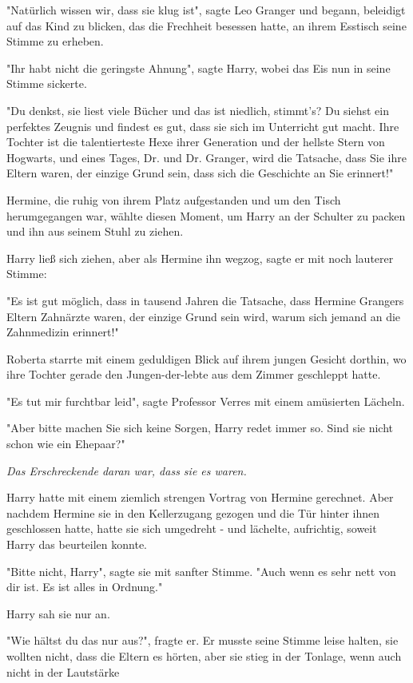 {"Natürlich wissen wir, dass sie klug ist", sagte Leo Granger und begann, beleidigt auf das Kind zu blicken, das die Frechheit besessen hatte, an ihrem Esstisch seine Stimme zu erheben.

"Ihr habt nicht die geringste Ahnung", sagte Harry, wobei das Eis nun in seine Stimme sickerte.

"Du denkst, sie liest viele Bücher und das ist niedlich, stimmt's? Du siehst ein perfektes Zeugnis und findest es gut, dass sie sich im Unterricht gut macht. Ihre Tochter ist die talentierteste Hexe ihrer Generation und der hellste Stern von Hogwarts, und eines Tages, Dr. und Dr. Granger, wird die Tatsache, dass Sie ihre Eltern waren, der einzige Grund sein, dass sich die Geschichte an Sie erinnert!"

Hermine, die ruhig von ihrem Platz aufgestanden und um den Tisch herumgegangen war, wählte diesen Moment, um Harry an der Schulter zu packen und ihn aus seinem Stuhl zu ziehen.

Harry ließ sich ziehen, aber als Hermine ihn wegzog, sagte er mit noch lauterer Stimme:

"Es ist gut möglich, dass in tausend Jahren die Tatsache, dass Hermine Grangers Eltern Zahnärzte waren, der einzige Grund sein wird, warum sich jemand an die Zahnmedizin erinnert!"

Roberta starrte mit einem geduldigen Blick auf ihrem jungen Gesicht dorthin, wo ihre Tochter gerade den Jungen-der-lebte aus dem Zimmer geschleppt hatte.

"Es tut mir furchtbar leid", sagte Professor Verres mit einem amüsierten Lächeln.

"Aber bitte machen Sie sich keine Sorgen, Harry redet immer so. Sind sie nicht schon wie ein Ehepaar?"

\emph{Das Erschreckende daran war, dass sie es waren.}

Harry hatte mit einem ziemlich strengen Vortrag von Hermine gerechnet. Aber nachdem Hermine sie in den Kellerzugang gezogen und die Tür hinter ihnen geschlossen hatte, hatte sie sich umgedreht - und lächelte, aufrichtig, soweit Harry das beurteilen konnte.

"Bitte nicht, Harry", sagte sie mit sanfter Stimme. "Auch wenn es sehr nett von dir ist. Es ist alles in Ordnung."

Harry sah sie nur an.

"Wie hältst du das nur aus?", fragte er. Er musste seine Stimme leise halten, sie wollten nicht, dass die Eltern es hörten, aber sie stieg in der Tonlage, wenn auch nicht in der Lautstärke

}
